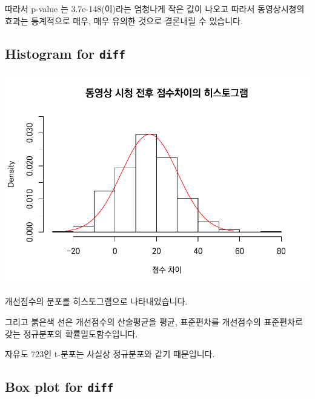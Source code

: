 \documentclass[
]{book}
\begin{document}
따라서 p-value 는 3.7e-148(이)라는 엄청나게 작은 값이 나오고 따라서 동영상시청의 효과는 통계적으로 매우, 매우 유의한 것으로 결론내릴 수 있습니다.

\subsection{\texorpdfstring{Histogram for \texttt{diff}}{Histogram for diff}}\label{histogram-for-diff}

\includegraphics{Quiz_report_2025_files/figure-latex/unnamed-chunk-316-1.pdf}

개선점수의 분포를 히스토그램으로 나타내었습니다.

그리고 붉은색 선은 개선점수의 산술평균을 평균, 표준편차를 개선점수의 표준편차로 갖는 정규분포의 확률밀도함수입니다.

자유도 723인 t-분포는 사실상 정규분포와 같기 때문입니다.

\subsection{\texorpdfstring{Box plot for \texttt{diff}}{Box plot for diff}}\label{box-plot-for-diff}
\end{document}
